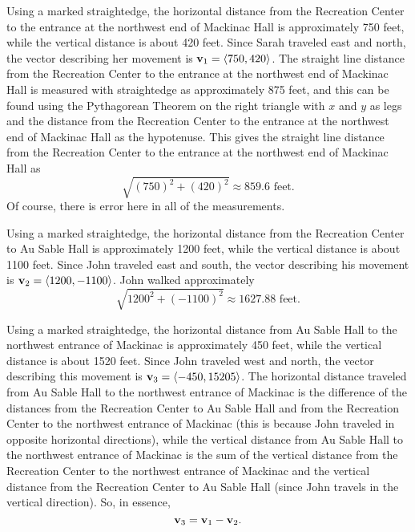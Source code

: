 \begin{activitySolution}
    \ba
   \item Using a marked straightedge, the horizontal distance from the Recreation Center to the entrance at the northwest end of Mackinac Hall is approximately 750 feet, while the vertical distance is about 420 feet. Since Sarah traveled east and north, the vector describing her movement is ${\mathbf{v}_1 = \langle 750, 420 \rangle}$. The straight line distance from the Recreation Center to the entrance at the northwest end of Mackinac Hall is measured with straightedge as approximately 875 feet, and this can be found using the Pythagorean Theorem on the right triangle with $x$ and $y$ as legs and the distance from the Recreation Center to the entrance at the northwest end of Mackinac Hall as the hypotenuse. This gives the straight line distance from the Recreation Center to the entrance at the northwest end of Mackinac Hall as
\[\sqrt{(750)^2 + (420)^2} \approx 859.6 \text{ feet}.\]
Of course, there is error here in all of the measurements.

    \item Using a marked straightedge, the horizontal distance from the Recreation Center to Au Sable Hall is approximately 1200 feet, while the vertical distance is about 1100 feet. Since John traveled east and south, the vector describing his movement is ${\mathbf{v}_2 = \langle 1200, -1100 \rangle}$. John walked approximately
\[\sqrt{1200^2 + (-1100)^2} \approx 1627.88 \text{ feet}.\]


    \item Using a marked straightedge, the horizontal distance from Au Sable Hall to the northwest entrance of Mackinac is approximately 450 feet, while the vertical distance is about 1520 feet. Since John traveled west and north, the vector describing this movement is ${\mathbf{v}_3 = \langle -450, 15205 \rangle}$. The horizontal distance traveled from Au Sable Hall to the northwest entrance of Mackinac is the difference of the distances from the Recreation Center to Au Sable Hall and from the Recreation Center to the northwest entrance of Mackinac (this is because John traveled in opposite horizontal directions), while the vertical distance from Au Sable Hall to the northwest entrance of Mackinac is the sum of the vertical distance from the Recreation Center to the northwest entrance of Mackinac and the vertical distance from the Recreation Center to Au Sable Hall (since John travels in the vertical direction). So, in essence,
\[\mathbf{v}_3 = \mathbf{v}_1 - \mathbf{v}_2.\]


	\ea

\end{activitySolution}

\afterpa 